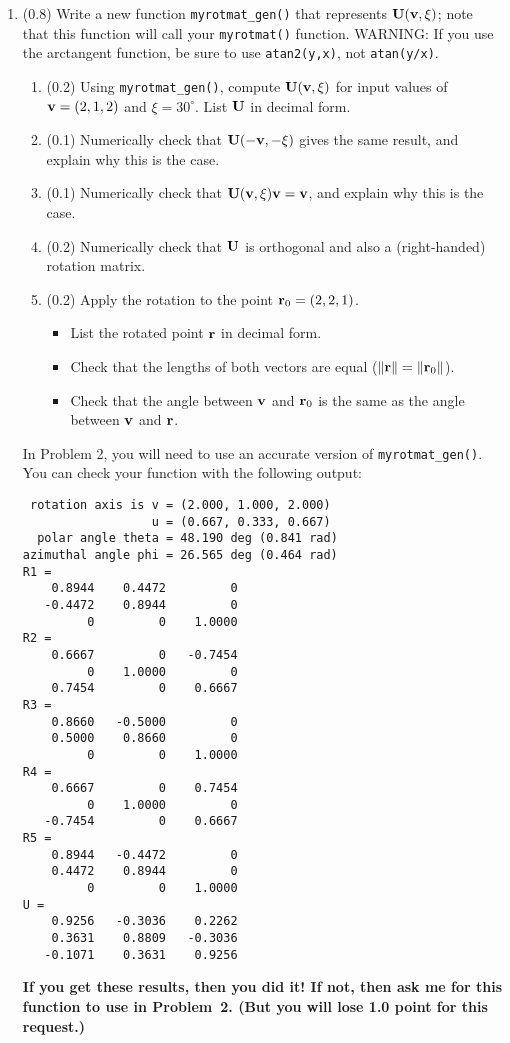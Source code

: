 \documentclass[11pt,titlepage,fleqn]{article}
\newcommand{\rotangB}{\xi}    %
\newcommand{\rotvec}{\bv}      %
\begin{document}
\begin{enumerate}
\item (0.8) Write a new function \verb+myrotmat_gen()+ that represents $\bU(\rotvec,\rotangB)$; note that this function will call your \verb+myrotmat()+ function. WARNING: If you use the arctangent function, be sure to use \verb+atan2(y,x)+, not \verb+atan(y/x)+.
%
\begin{enumerate}
\item (0.2) Using \verb+myrotmat_gen()+, compute $\bU(\rotvec,\rotangB)$ for input values of $\rotvec = (2,1,2)$ and $\rotangB = 30^\circ$. List $\mbox{${\bf U}$}$ in decimal form.
\item (0.1) Numerically check that $\bU(-\rotvec,-\rotangB)$ gives the same result, and explain why this is the case.
\item (0.1) Numerically check that $\bU(\rotvec,\rotangB)\rotvec = \rotvec$, and explain why this is the case.
\item (0.2) Numerically check that $\mbox{${\bf U}$}$ is orthogonal and also a (right-handed) rotation matrix.
\item (0.2) Apply the rotation to the point $\mbox{${\bf r}$}_0 = (2,2,1)$.
%
\begin{itemize}
\item List the rotated point $\mbox{${\bf r}$}$ in decimal form.
\item Check that the lengths of both vectors are equal ($\|\mbox{${\bf r}$}\| = \|\mbox{${\bf r}$}_0\|$).
\item Check that the angle between $\rotvec$ and $\mbox{${\bf r}$}_0$ is the same as the angle between  $\rotvec$ and $\mbox{${\bf r}$}$.
\end{itemize}
\end{enumerate}
%
In Problem 2, you will need to use an accurate version of \verb+myrotmat_gen()+. You can check your function with the following output:
%
\begin{spacing}{1.0}
\begin{verbatim}
 rotation axis is v = (2.000, 1.000, 2.000)
                  u = (0.667, 0.333, 0.667)
  polar angle theta = 48.190 deg (0.841 rad)
azimuthal angle phi = 26.565 deg (0.464 rad)
R1 =
    0.8944    0.4472         0
   -0.4472    0.8944         0
         0         0    1.0000
R2 =
    0.6667         0   -0.7454
         0    1.0000         0
    0.7454         0    0.6667
R3 =
    0.8660   -0.5000         0
    0.5000    0.8660         0
         0         0    1.0000
R4 =
    0.6667         0    0.7454
         0    1.0000         0
   -0.7454         0    0.6667
R5 =
    0.8944   -0.4472         0
    0.4472    0.8944         0
         0         0    1.0000
U =
    0.9256   -0.3036    0.2262
    0.3631    0.8809   -0.3036
   -0.1071    0.3631    0.9256
\end{verbatim}
\end{spacing}
%
{\bf If you get these results, then you did it! If not, then ask me for this function to use in Problem~2. (But you will lose 1.0 point for this request.)}


\end{enumerate}
\end{document}
